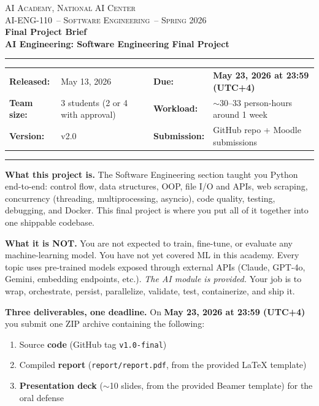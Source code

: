 \documentclass[11pt,a4paper]{article}
\newcommand{\coursecode}{AI-ENG-110}
\newcommand{\coursename}{Software Engineering}
\newcommand{\institution}{AI Academy, National AI Center}
\newcommand{\semester}{Spring 2026}
\newcommand{\projecttitle}{AI Engineering: Software Engineering Final Project}
\newcommand{\releasedate}{May 13, 2026}
\newcommand{\duedate}{May 23, 2026 at 23:59 (UTC+4)}
\newcommand{\version}{v2.0}
\begin{document}
\begin{center}
{\small \textsc{\institution} \\[0.2em] \textsc{\coursecode\ -- \coursename\ -- \semester}}\\[1.2em]
{\Large\bfseries\color{accent} Final Project Brief}\\[0.3em]
{\LARGE\bfseries \projecttitle}\\[1em]
\rule{0.85\textwidth}{0.6pt}
\end{center}

\begin{tabularx}{\textwidth}{@{}lXlX@{}}
\textbf{Released:} & \releasedate & \textbf{Due:} & \textcolor{accent2}{\textbf{\duedate}} \\
\textbf{Team size:} & 3 students (2 or 4 with approval) & \textbf{Workload:} & $\sim$30--33 person-hours around 1 week \\
\textbf{Version:} & \version & \textbf{Submission:} & GitHub repo + Moodle submissions \\
\end{tabularx}

\vspace{0.4em}\hrule\vspace{0.6em}

\begin{infobox}[At a glance]
\textbf{What this project is.} The Software Engineering section taught you Python end-to-end: control flow, data structures, OOP, file I/O and APIs, web scraping, concurrency (threading, multiprocessing, asyncio), code quality, testing, debugging, and Docker. This final project is where you put all of it together into one shippable codebase.

\smallskip
\textbf{What it is NOT.} You are not expected to train, fine-tune, or evaluate any machine-learning model. You have not yet covered ML in this academy. Every topic uses pre-trained models exposed through external APIs (Claude, GPT-4o, Gemini, embedding endpoints, etc.). \emph{The AI module is provided.} Your job is to wrap, orchestrate, persist, parallelize, validate, test, containerize, and ship it.

\smallskip
\textbf{Three deliverables, one deadline.} On \textcolor{accent2}{\textbf{\duedate}} you submit one ZIP archive containing the following:
\begin{enumerate}[topsep=2pt,itemsep=1pt,leftmargin=2.2em]
  \item Source \textbf{code} (GitHub tag \texttt{v1.0-final})
  \item Compiled \textbf{report} (\texttt{report/report.pdf}, from the provided LaTeX template)
  \item \textbf{Presentation deck} ($\sim$10 slides, from the provided Beamer template) for the oral defense
\end{enumerate}
\end{infobox}
\end{document}
